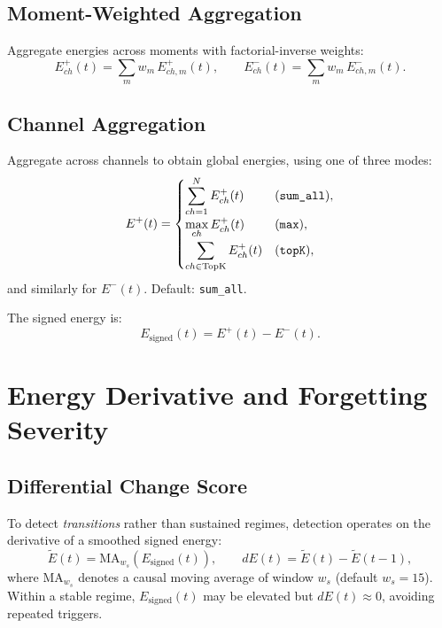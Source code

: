 \documentclass{article}
\begin{document}
\subsection{Moment-Weighted Aggregation}
Aggregate energies across moments with factorial-inverse weights:
\[
E^{+}_{ch}(t) = \sum_{m} w_m\, E^{+}_{ch,m}(t),\qquad
E^{-}_{ch}(t) = \sum_{m} w_m\, E^{-}_{ch,m}(t).
\]

\subsection{Channel Aggregation}
Aggregate across channels to obtain global energies, using one of three modes:
\[
E^{+}(t) =
\begin{cases}
\displaystyle\sum_{ch=1}^N E^{+}_{ch}(t) & (\text{\texttt{sum\_all}}), \\[6pt]
\displaystyle\max_{ch} E^{+}_{ch}(t) & (\text{\texttt{max}}), \\[6pt]
\displaystyle\sum_{ch\in\mathrm{TopK}} E^{+}_{ch}(t) & (\text{\texttt{topK}}),
\end{cases}
\]
and similarly for $E^{-}(t)$. Default: \texttt{sum\_all}.

The signed energy is:
\[
E_{\mathrm{signed}}(t) = E^{+}(t) - E^{-}(t).
\]

\section{Energy Derivative and Forgetting Severity}

\subsection{Differential Change Score}
To detect \emph{transitions} rather than sustained regimes, detection operates on the derivative
of a smoothed signed energy:
\[
\widetilde{E}(t) = \mathrm{MA}_{w_s}\!\left(E_{\mathrm{signed}}(t)\right),\qquad
dE(t) = \widetilde{E}(t) - \widetilde{E}(t-1),
\]
where $\mathrm{MA}_{w_s}$ denotes a causal moving average of window $w_s$ (default $w_s = 15$).
Within a stable regime, $E_{\mathrm{signed}}(t)$ may be elevated but $dE(t)\approx 0$, avoiding
repeated triggers.
\end{document}
